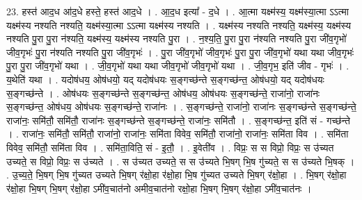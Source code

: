 \documentclass[17pt]{extarticle}
\begin{document}
23. हस्त॑ आद॒ध आ॑द॒धे हस्ते॒ हस्त॑ आद॒धे । . आ॒द॒ध इत्या᳚ - द॒धे । . आ॒त्मा यक्ष्म॑स्य॒ यक्ष्म॑स्या॒त्मा ऽऽत्मा यक्ष्म॑स्य नश्यति नश्यति॒ यक्ष्म॑स्या॒त्मा ऽऽत्मा यक्ष्म॑स्य नश्यति । . यक्ष्म॑स्य नश्यति नश्यति॒ यक्ष्म॑स्य॒ यक्ष्म॑स्य नश्यति पु॒रा पु॒रा न॑श्यति॒ यक्ष्म॑स्य॒ यक्ष्म॑स्य नश्यति पु॒रा । . न॒श्य॒ति॒ पु॒रा पु॒रा न॑श्यति नश्यति पु॒रा जी॑व॒गृभो॑ जीव॒गृभः॑ पु॒रा न॑श्यति नश्यति पु॒रा जी॑व॒गृभः॑ । . पु॒रा जी॑व॒गृभो॑ जीव॒गृभः॑ पु॒रा पु॒रा जी॑व॒गृभो॑ यथा यथा जीव॒गृभः॑ पु॒रा पु॒रा जी॑व॒गृभो॑ यथा । . जी॒व॒गृभो॑ यथा यथा जीव॒गृभो॑ जीव॒गृभो॑ यथा । . जी॒व॒गृभ॒ इति॑ जीव - गृभः॑ । . य॒थेति॑ यथा । . यदोष॑धय॒ ओष॑धयो॒ यद् यदोष॑धयः स॒ङ्गच्छ॑न्ते स॒ङ्गच्छ॑न्त॒ ओष॑धयो॒ यद् यदोष॑धयः स॒ङ्गच्छ॑न्ते । . ओष॑धयः स॒ङ्गच्छ॑न्ते स॒ङ्गच्छ॑न्त॒ ओष॑धय॒ ओष॑धयः स॒ङ्गच्छ॑न्ते॒ राजा॑नो॒ राजा॑नः स॒ङ्गच्छ॑न्त॒ ओष॑धय॒ ओष॑धयः स॒ङ्गच्छ॑न्ते॒ राजा॑नः । . स॒ङ्गच्छ॑न्ते॒ राजा॑नो॒ राजा॑नः स॒ङ्गच्छ॑न्ते स॒ङ्गच्छ॑न्ते॒ राजा॑नः॒ समि॑तौ॒ समि॑तौ॒ राजा॑नः स॒ङ्गच्छ॑न्ते स॒ङ्गच्छ॑न्ते॒ राजा॑नः॒ समि॑तौ । . स॒ङ्गच्छ॑न्त॒ इति॑ सं - गच्छ॑न्ते । . राजा॑नः॒ समि॑तौ॒ समि॑तौ॒ राजा॑नो॒ राजा॑नः॒ समि॑ता विवेव॒ समि॑तौ॒ राजा॑नो॒ राजा॑नः॒ समि॑ता विव । . समि॑ता विवेव॒ समि॑तौ॒ समि॑ता विव । . समि॑ता॒विति॒ सं - इ॒तौ॒ । . इ॒वेती॑व । . विप्रः॒ स स विप्रो॒ विप्रः॒ स उ॑च्यत उच्यते॒ स विप्रो॒ विप्रः॒ स उ॑च्यते । . स उ॑च्यत उच्यते॒ स स उ॑च्यते भि॒षग् भि॒ष गु॑च्यते॒ स स उ॑च्यते भि॒षक् । . उ॒च्य॒ते॒ भि॒षग् भि॒ष गु॑च्यत उच्यते भि॒षग् र॑क्षो॒हा र॑क्षो॒हा भि॒ष गु॑च्यत उच्यते भि॒षग् र॑क्षो॒हा । . भि॒षग् र॑क्षो॒हा र॑क्षो॒हा भि॒षग् भि॒षग् र॑क्षो॒हा ऽमी॑व॒चात॑नो अमीव॒चात॑नो रक्षो॒हा भि॒षग् भि॒षग् र॑क्षो॒हा ऽमी॑व॒चात॑नः । \newline
\end{document}
